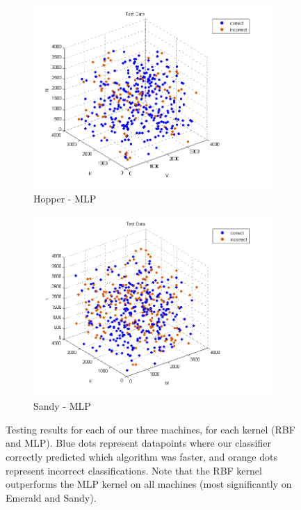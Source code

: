 \begin{figure}[t]
\begin{subfigure}[t]{0.33\textwidth}
            \includegraphics[width=\textwidth]{figures/hopper_test_mlp.png}
            \caption{Hopper - MLP}
            \label{f:classify_mlp_hopper}
        \end{subfigure}
        \begin{subfigure}[t]{0.33\textwidth}
            \includegraphics[width=\textwidth]{figures/sandy_test_mlp.png}
            \caption{Sandy - MLP}
            \label{f:classify_mlp_sandy}
        \end{subfigure}

        \caption{Testing results for each of our three machines, for each kernel (RBF and MLP). Blue dots represent datapoints where our classifier correctly predicted which algorithm was faster, and orange dots represent incorrect classifications. Note that the RBF kernel outperforms the MLP kernel on all machines (most significantly on Emerald and Sandy).}
    \label{fig:classifying}
\end{figure}

